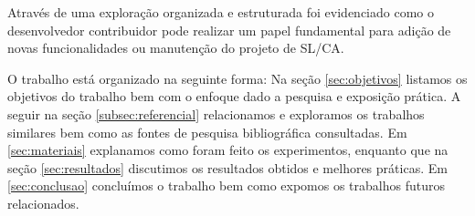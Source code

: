 Através de uma exploração organizada e estruturada foi evidenciado como o desenvolvedor contribuidor pode realizar um papel fundamental para adição de novas funcionalidades ou manutenção do projeto de SL/CA.

O trabalho está organizado na seguinte forma: Na seção \ref{sec:objetivos} listamos os objetivos do trabalho bem com o enfoque dado a pesquisa e exposição prática. A seguir na seção \ref{subsec:referencial} relacionamos e exploramos os trabalhos similares bem como as fontes de pesquisa bibliográfica consultadas. Em \ref{sec:materiais} explanamos como foram feito os experimentos, enquanto que na seção \ref{sec:resultados} discutimos os resultados obtidos e melhores práticas. Em \ref{sec:conclusao} concluímos o trabalho bem como expomos os trabalhos futuros relacionados.

